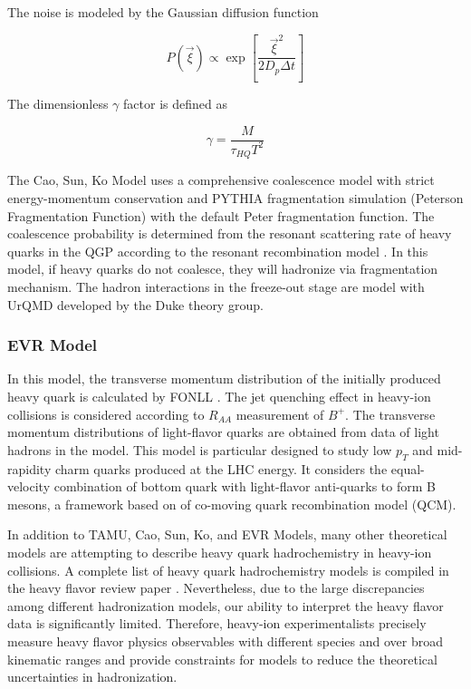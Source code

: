 The noise is modeled by the Gaussian diffusion function 

\begin{equation}
P(\vec{\xi}) \propto \exp[\frac{\vec{\xi}^2}{2D_p \Delta t}]
\end{equation}

The dimensionless $\gamma$ factor is defined as

\begin{equation}
\gamma = \frac{M}{\tau_{HQ} T^2}
\end{equation}


The Cao, Sun, Ko Model uses a comprehensive coalescence model with strict energy-momentum conservation and PYTHIA fragmentation simulation (Peterson Fragmentation Function)\cite{PYTHIAFrag} with the default Peter fragmentation function. The coalescence probability is determined from the resonant scattering rate of heavy quarks in the QGP according to the resonant recombination model \cite{RRM1,RRM2}. In this model, if heavy quarks do not coalesce, they will hadronize via fragmentation mechanism. The hadron interactions in the freeze-out stage are model with UrQMD developed by the Duke theory group. 



 
\subsubsection{EVR Model}

In this model, the transverse momentum distribution of the initially produced heavy quark is calculated by FONLL \cite{EVR}. The jet quenching effect in heavy-ion collisions is considered according to $R_{AA}$ measurement of $B^+$. The transverse momentum distributions of light-flavor quarks are obtained from data of light hadrons in the model. This model is particular designed to study low $p_T$ and mid-rapidity charm quarks produced at the LHC energy. It considers the equal-velocity combination of bottom quark with light-flavor anti-quarks  to form B mesons, a framework based on of co-moving quark recombination model (QCM).


In addition to TAMU, Cao, Sun, Ko, and EVR Models, many other theoretical models are attempting to describe heavy quark hadrochemistry in heavy-ion collisions. A complete list of heavy quark hadrochemistry models is compiled in the heavy flavor review paper \cite{HQRaff}. Nevertheless, due to the large discrepancies among different hadronization models, our ability to interpret the heavy flavor data is significantly limited. Therefore, heavy-ion experimentalists precisely measure heavy flavor physics observables with different species and over broad kinematic ranges and provide constraints for models to reduce the theoretical uncertainties in hadronization.


